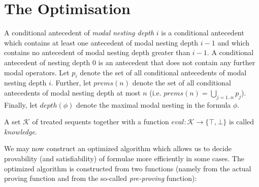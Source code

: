 \documentclass{entcs} \usepackage{entcsmacro}
\begin{document}
\section{The Optimisation}

\begin{definition}
A conditional antecedent of \emph{modal nesting depth} $i$ is a
conditional antecedent which contains at least one antecedent of
modal nesting depth $i-1$ and which contains no antecedent 
of modal nesting depth greater than $i-1$. A
conditional antecedent of nesting depth 0 is an antecedent
that does not contain any further modal operators.
Let $p_i$ denote the set of all conditional antecedents of modal
nesting depth $i$. Further, let $prems(n)$ denote the set of all
conditional antecedents of modal nesting depth at most $n$ (i.e.
$prems(n)=\bigcup_{j=1..n}^{} p_j$).
Finally, let $depth(\phi)$ denote the maximal modal nesting in
the formula $\phi$.
\end{definition}


\begin{definition}
A set $\mathcal{K}$ of treated sequents together with a function
$eval:\mathcal{K}\rightarrow \{\top,\bot\}$ is called \emph{knowledge}.
\end{definition}

We may now construct an optimized algorithm which allows us
to decide provability (and satisfiability) of formulae more efficiently
in some cases. The optimized algorithm is constructed from two functions
(namely from the actual proving function and from the so-called
\emph{pre-proving} function):
\end{document}
